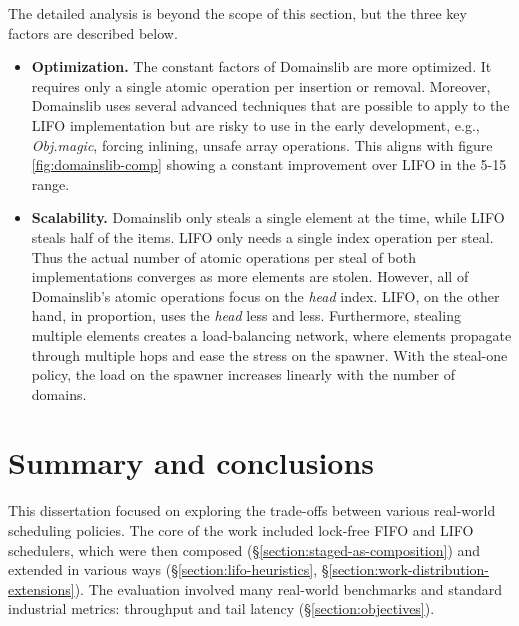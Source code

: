 \documentclass[12pt,a4paper,twoside]{report}
\begin{document}
The detailed analysis is beyond the scope of this section, but the three key factors are described below.
\begin{itemize}
    \item \textbf{Optimization.} The constant factors of Domainslib are more optimized. It requires only a single atomic operation per insertion or removal. Moreover, Domainslib uses several advanced techniques that are possible to apply to the LIFO implementation but are risky to use in the early development, e.g., \textit{Obj.magic}, forcing inlining, unsafe array operations. This aligns with figure \ref{fig:domainslib-comp} showing a constant improvement over LIFO in the 5-15 range. 
    \item \textbf{Scalability.} Domainslib only steals a single element at the time, while LIFO steals half of the items. LIFO only needs a single index operation per steal. Thus the actual number of atomic operations per steal of both implementations converges as more elements are stolen. However, all of Domainslib's atomic operations focus on the \textit{head} index. LIFO, on the other hand, in proportion, uses the \textit{head} less and less. Furthermore, stealing multiple elements creates a load-balancing network, where elements propagate through multiple hops and ease the stress on the spawner. With the steal-one policy, the load on the spawner increases linearly with the number of domains.
\end{itemize} 

\chapter{Summary and conclusions}
\label{section:summary_and_conclusion}

This dissertation focused on exploring the trade-offs between various real-world scheduling policies. The core of the work included lock-free FIFO and LIFO schedulers, which were then composed (\S\ref{section:staged-as-composition}) and extended in various ways (\S\ref{section:lifo-heuristics}, \S\ref{section:work-distribution-extensions}). The evaluation involved many real-world benchmarks and standard industrial metrics: throughput and tail latency (\S\ref{section:objectives}). 
\end{document}
